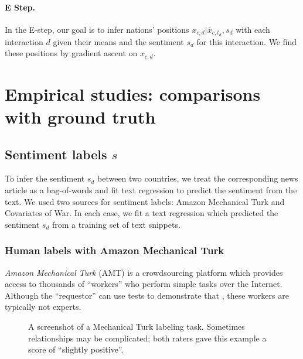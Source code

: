 \paragraph{E Step.} In the E-step, our goal is to infer nations'
positions $x_{c,d} | \bar{x}_{c,t_d}, s_d$ with each interaction $d$ given
their means and the sentiment $s_d$ for this interaction.  We find
these positions by gradient ascent on $x_{c,d}$.

\section{Empirical studies: comparisons with ground truth}

\subsection{Sentiment labels $s$}
\label{section:sentiment_models}

To infer the sentiment $s_d$ between two countries, we treat the
corresponding news article as a bag-of-words and fit text regression
\cite{kogan:2009} to predict the sentiment from the text.  We used two
sources for sentiment labels: Amazon Mechanical Turk and Covariates of
War.  In each case, we fit a text regression which predicted the
sentiment $s_d$ from a training set of text snippets.

\subsubsection{Human labels with Amazon Mechanical Turk}
\label{section:mturk}

\emph{Amazon Mechanical Turk} (AMT) is a crowdsourcing platform which
provides access to thousands of ``workers'' who perform simple tasks
over the Internet.  Although the ``requestor'' can use tests to
demonstrate that , these workers are typically not experts.

\begin{figure}
  \setlength\fboxsep{0pt}
  \setlength\fboxrule{0.5pt}
  \center {}
  \label{figure:mechanical_turk_sample}
  \small\caption{A screenshot of a Mechanical Turk labeling task.
    Sometimes relationships may be complicated; both raters gave this
    example a score of ``slightly positive''.}
  \normalsize
\end{figure}

